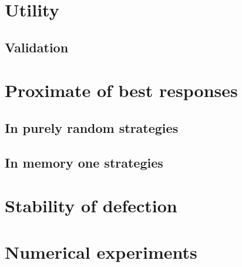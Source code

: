 \documentclass[10pt]{article}
\begin{document}
\section{Utility}


\subsection{Validation}

\section{Proximate of best responses}
\subsection{In purely random strategies}
\subsection{In memory one strategies}

\section{Stability of defection}

\section{Numerical experiments}



\end{document}
